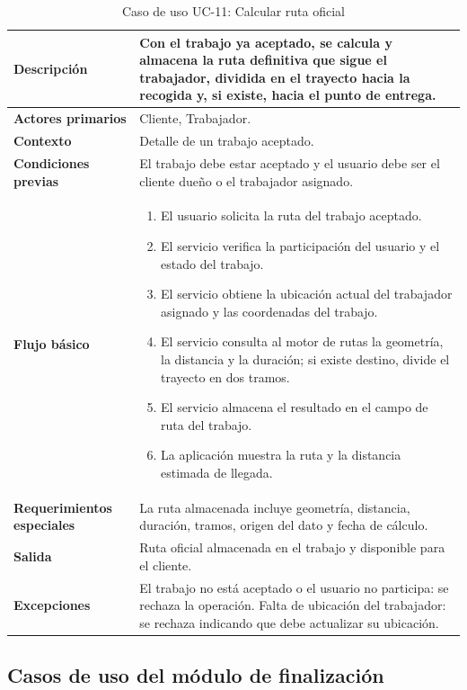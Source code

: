 \documentclass[doc,12pt,a4paper]{apa7}
\begin{document}
\begin{longtable}{|P{3.3cm}|L{11.2cm}|}
\caption{Caso de uso UC-11: Calcular ruta oficial}\\
\hline
\textbf{Descripción} & Con el trabajo ya aceptado, se calcula y almacena la ruta definitiva que sigue el trabajador, dividida en el trayecto hacia la recogida y, si existe, hacia el punto de entrega. \\ \hline
\textbf{Actores primarios} & Cliente, Trabajador. \\ \hline
\textbf{Contexto} & Detalle de un trabajo aceptado. \\ \hline
\textbf{Condiciones previas} & El trabajo debe estar aceptado y el usuario debe ser el cliente dueño o el trabajador asignado. \\ \hline
\textbf{Flujo básico} &
\begin{enumerate}
    \item El usuario solicita la ruta del trabajo aceptado.
    \item El servicio verifica la participación del usuario y el estado del trabajo.
    \item El servicio obtiene la ubicación actual del trabajador asignado y las coordenadas del trabajo.
    \item El servicio consulta al motor de rutas la geometría, la distancia y la duración; si existe destino, divide el trayecto en dos tramos.
    \item El servicio almacena el resultado en el campo de ruta del trabajo.
    \item La aplicación muestra la ruta y la distancia estimada de llegada.
\end{enumerate} \\ \hline
\textbf{Requerimientos especiales} & La ruta almacenada incluye geometría, distancia, duración, tramos, origen del dato y fecha de cálculo. \\ \hline
\textbf{Salida} & Ruta oficial almacenada en el trabajo y disponible para el cliente. \\ \hline
\textbf{Excepciones} & El trabajo no está aceptado o el usuario no participa: se rechaza la operación. Falta de ubicación del trabajador: se rechaza indicando que debe actualizar su ubicación. \\ \hline
\end{longtable}

\subsection{Casos de uso del módulo de finalización}
\end{document}
